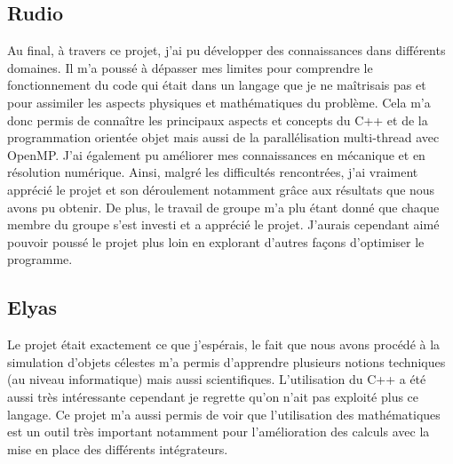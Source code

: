 \subsection{Rudio}

Au final, à travers ce projet, j'ai pu développer des connaissances dans différents domaines. Il m'a poussé à dépasser mes limites pour comprendre le fonctionnement du code qui était dans un langage que je ne maîtrisais pas et pour assimiler les aspects physiques et mathématiques du problème.
Cela m'a donc permis de connaître les principaux aspects et concepts du C++ et de la programmation orientée objet mais aussi de la parallélisation multi-thread avec OpenMP. J'ai également pu améliorer mes connaissances en mécanique et en résolution numérique. 
Ainsi, malgré les difficultés rencontrées, j'ai vraiment apprécié le projet et son déroulement notamment grâce aux résultats que nous avons pu obtenir. De plus, le travail de groupe m'a plu étant donné que chaque membre du groupe s'est investi et a apprécié le projet.
J'aurais cependant aimé pouvoir poussé le projet plus loin en explorant d'autres façons d'optimiser le programme.


\subsection{Elyas}

Le projet était exactement ce que j'espérais, le fait que nous avons procédé à la simulation d'objets célestes m'a permis d'apprendre plusieurs notions techniques (au niveau informatique) mais aussi scientifiques. L'utilisation du C++ a été aussi très intéressante cependant je regrette qu'on n'ait pas exploité plus ce langage. Ce projet m'a aussi permis de voir que l'utilisation des mathématiques est un outil très important notamment pour l'amélioration des calculs avec la mise en place des différents intégrateurs.


